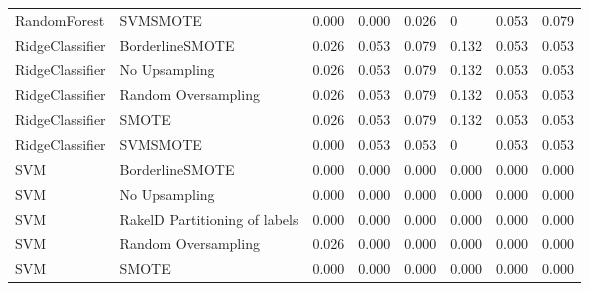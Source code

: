\begin{tabular}{llllllll}
                   RandomForest &                      SVMSMOTE & 0.000 &                     0.000 &                 0.026 &                      0 &                                   0.053 &    0.079 \\
                RidgeClassifier &               BorderlineSMOTE & 0.026 &                     0.053 &                 0.079 &                  0.132 &                                   0.053 &    0.053 \\
                RidgeClassifier &                 No Upsampling & 0.026 &                     0.053 &                 0.079 &                  0.132 &                                   0.053 &    0.053 \\
                RidgeClassifier &           Random Oversampling & 0.026 &                     0.053 &                 0.079 &                  0.132 &                                   0.053 &    0.053 \\
                RidgeClassifier &                         SMOTE & 0.026 &                     0.053 &                 0.079 &                  0.132 &                                   0.053 &    0.053 \\
                RidgeClassifier &                      SVMSMOTE & 0.000 &                     0.053 &                 0.053 &                      0 &                                   0.053 &    0.053 \\
                            SVM &               BorderlineSMOTE & 0.000 &                     0.000 &                 0.000 &                  0.000 &                                   0.000 &    0.000 \\
                            SVM &                 No Upsampling & 0.000 &                     0.000 &                 0.000 &                  0.000 &                                   0.000 &    0.000 \\
                            SVM & RakelD Partitioning of labels & 0.000 &                     0.000 &                 0.000 &                  0.000 &                                   0.000 &    0.000 \\
                            SVM &           Random Oversampling & 0.026 &                     0.000 &                 0.000 &                  0.000 &                                   0.000 &    0.000 \\
                            SVM &                         SMOTE & 0.000 &                     0.000 &                 0.000 &                  0.000 &                                   0.000 &    0.000 \\

\end{tabular}

